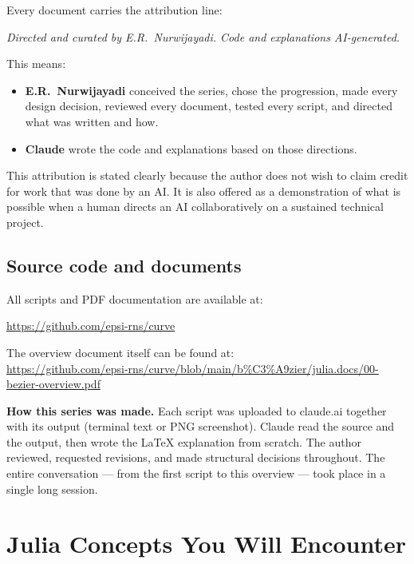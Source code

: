 \documentclass[12pt, a4paper]{article}
\begin{document}
Every document carries the attribution line:
\begin{center}
\textit{Directed and curated by E.R.\ Nurwijayadi.
Code and explanations AI-generated.}
\end{center}

This means:
\begin{itemize}
  \item \textbf{E.R.\ Nurwijayadi} conceived the series,
        chose the progression, made every design decision,
        reviewed every document, tested every script,
        and directed what was written and how.
  \item \textbf{Claude} wrote the code and explanations
        based on those directions.
\end{itemize}

This attribution is stated clearly because the author does
not wish to claim credit for work that was done by an AI.
It is also offered as a demonstration of what is possible
when a human directs an AI collaboratively on a
sustained technical project.

\subsection{Source code and documents}

All scripts and PDF documentation are available at:

\begin{center}
\url{https://github.com/epsi-rns/curve}
\end{center}

The overview document itself can be found at:\\[4pt]
\url{https://github.com/epsi-rns/curve/blob/main/b%C3%A9zier/julia.docs/00-bezier-overview.pdf}

\begin{notebox}
\textbf{How this series was made.}
Each script was uploaded to claude.ai together with its
output (terminal text or PNG screenshot).
Claude read the source and the output, then wrote the
\LaTeX{} explanation from scratch.
The author reviewed, requested revisions, and made
structural decisions throughout.
The entire conversation --- from the first script to this
overview --- took place in a single long session.
\end{notebox}


\section{Julia Concepts You Will Encounter}
\end{document}
